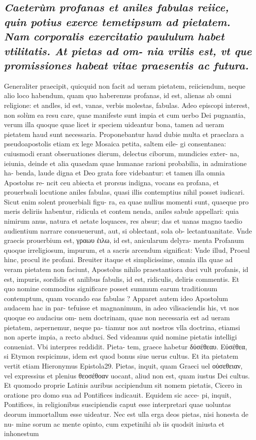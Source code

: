 \documentclass{article}
\begin{document}
\begin{pages}
\subsection*{\textit{Caeterùm profanas et aniles fabulas reiice, quin potius exerce temetipsum ad pietatem. Nam corporalis exercitatio paululum habet vtilitatis. At pietas ad om- nia vrilis est, vt que promissiones habeat vitae praesentis ac futura. }}\pstart Generaliter praecipit, quicquid non facit ad ueram pietatem, reiiciendum, neque alio loco habendum, quam quo haberemus profanas, id est, alienas ab omni religione: et andles, id est, vanas, verbis molestas, fabulas. Adeo episcopi interest, non solùm ea resu care, quae manifeste sunt impia et cum uerbo Dei pugnantia, verum illa quoque quae licet ir speciem uideantur bona, tamen ad ueram pietatem haud sunt necessaria. Proponebantur  haud dubie multa et praeclara a pseudoapostolis etiam ex lege Mosaica petita, saltem eile- gi consentanea: cuiusmodi erant obseruationes dierum, delectus ciborum, mundicies exter- na, ieiunia, deinde et alia quaedam quae humanae rarioni probabilia, in admiratione ha- benda, laude digna et Deo grata fore videbantur: et tamen illa omnia Apostolus re- ncit ceu abiecta et prorsus indigna, vocans ea profana, et prouerbsali locutione aniles fabulas, quasi illis contemptius nihil posset iudicari. Sicut enim solent prouerbiali figu- ra, ea quae nullius momenti sunt, quaeque pro meris deliriis habentur, ridicula et contem nenda, aniles sabule appellari: quia nimirum anus, natura et aetate loquaces, res absur; das et uanas magno taedio audientium narrare consueuerunt, aut, si oblectant, sola ob- lectantuanitate. Vnde graecis prouerbium est, γραωυ ἐιλω, id est, anicularum delyra- menta Profanum quoque irreligiosum, impurum, et a sacris arcendum significat: Vnde illud, Proeul hinc, procul ite profani. Breuiter itaque et simplicissime, omnia illa quae ad veram pietatem non faciunt, Apostolus nihilo praestantiora duci vult profanis, id est, impuris, sordidis et anilibus fabulis, id est, ridiculis, deliris commentis. Et quo nomine commodius significare posset summum earum traditionum contemptum, quam vocando eas fabulas ? Apparet autem ideo Apostolum audacem hac in par- tefuisse et magnanimum, in adeo vilisaciendis his, vt nos quoque eo audacius om- nem doctrinam, quae non necessaria est ad ueram pietatem, aspernemur, neque pa- tiamur nos aut nostros vlla doctrina, etiamsi non aperte impia, a recto abduci. Sed videamus quid nomine pietatis intelligi conueniat. Vbi interpres reddidit. Pieta- tem, graece habetur δὐσέθεαυ. Εύσέθεα, si Etymon respicimus, idem est quod bonus siue uerus cultus. Et ita pietatem vertit etiam Hieronymus Epistola29. Pietas, inquit, quam Graeci uel οὐσεθειαν, vel expressius et plenius θεοσέθοαν uocant, aliud non est, quam iustus Dei cultus. Et quomodo proprie Latinis auribus accipiendum sit nomem pietatis, Cicero in oratione pro domo sua ad Pontifices indicauit. Equidem sic acce- pi, inquit, Pontifices, in religionibus suscipiendis caput esse interpretari quae uoluntas deorum immortallum esse uideatur. Nec est ulla erga deos pietas, nisi honesta de nu- mine sorum ac mente opinto, cum expetinihi ab iis quodsit iniusta et inhonestum  \pend

\end{pages}
\end{document}
